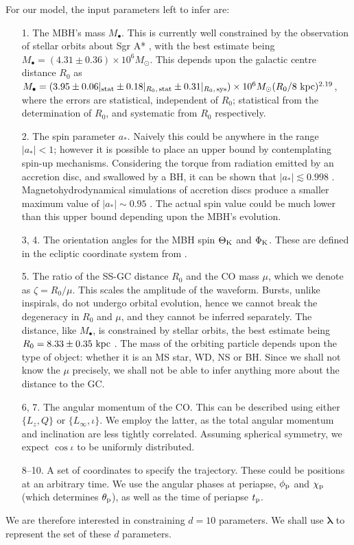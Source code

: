 For our model, the input parameters left to infer are:
\begin{enumerate}[leftmargin=*, widest=\:88--88.]
\item[1.] The MBH's mass $M_\bullet$. This is currently well constrained by the observation of stellar orbits about Sgr A* \citep{Ghez2008, Gillessen2009}, with the best estimate being $M_\bullet = (4.31 \pm 0.36) \times 10^6 M_\odot$. This depends upon the galactic centre distance $R_0$ as $M_\bullet = (3.95 \pm 0.06|_\mathrm{stat} \pm 0.18|_{R_0, \, \mathrm{stat}} \pm  0.31|_{R_0, \, \mathrm{sys}}) \times 10^6 M_\odot (R_0 / 8~\mathrm{kpc})^{2.19}$, where the errors are statistical, independent of $R_0$; statistical from the determination of $R_0$, and systematic from $R_0$ respectively.
\item[2.] The spin parameter $a_\ast$. Naively this could be anywhere in the range $|a_\ast| < 1$; however it is possible to place an upper bound by contemplating spin-up mechanisms. Considering the torque from radiation emitted by an accretion disc, and swallowed by a BH, it can be shown that $|a_\ast| \lesssim 0.998$ \citep{Thorne1974}. Magnetohydrodynamical simulations of accretion discs produce a smaller maximum value of $|a_\ast| \sim 0.95$ \citep{Gammie2004}. The actual spin value could be much lower than this upper bound depending upon the MBH's evolution.
\item[3, 4.] The orientation angles for the MBH spin $\Theta_\mathrm{K}$ and $\Phi_\mathrm{K}$. These are defined in the ecliptic coordinate system from .
\item[5.] The ratio of the SS-GC distance $R_0$ and the CO mass $\mu$, which we denote as $\zeta = R_0/\mu$. This scales the amplitude of the waveform. Bursts, unlike inspirals, do not undergo orbital evolution, hence we cannot break the degeneracy in $R_0$ and $\mu$, and they cannot be inferred separately. The distance, like $M_\bullet$, is constrained by stellar orbits, the best estimate being $R_0 = 8.33 \pm 0.35~\mathrm{kpc}$ \citep{Gillessen2009}. The mass of the orbiting particle depends upon the type of object: whether it is an MS star, WD, NS or BH. Since we shall not know the $\mu$ precisely, we shall not be able to infer anything more about the distance to the GC.
\item[6, 7.] The angular momentum of the CO. This can be described using either $\{L_z, Q\}$ or $\{L_\infty, \iota\}$. We employ the latter, as the total angular momentum and inclination are less tightly correlated. Assuming spherical symmetry, we expect $\cos \iota$ to be uniformly distributed.
\item[8--10.] A set of coordinates to specify the trajectory. These could be positions at an arbitrary time. We use the angular phases at periapse, $\phi_\mathrm{p}$ and $\chi_\mathrm{p}$ (which determines $\theta_\mathrm{p}$), as well as the time of periapse $t_\mathrm{p}$.
\end{enumerate}
We are therefore interested in constraining $d = 10$ parameters. We shall use $\boldsymbol{\lambda}$ to represent the set of these $d$ parameters.

